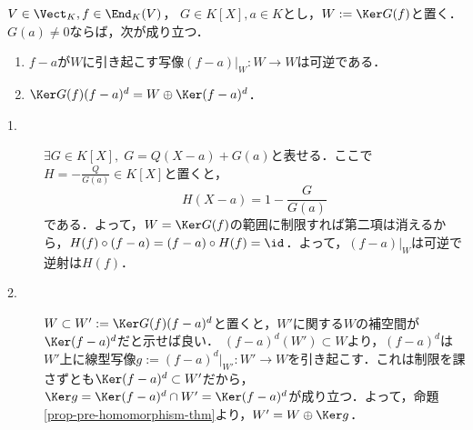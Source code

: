 \documentclass[uplatex, dvipdfmx]{jsreport}
\begin{document}
\begin{lemma}\label{lemma-for-triangulization}
    $V\in\Vect_K,f\in\End_K(V)$，
    $G\in K[X],a\in K$とし，$W:=\Ker G(f)$と置く．$G(a)\ne 0$ならば，次が成り立つ．
    \begin{enumerate}
        \item $f-a$が$W$に引き起こす写像$(f-a)|_W:W\to W$は可逆である．
        \item $\Ker G(f)(f-a)^d=W\oplus\Ker(f-a)^d$．
    \end{enumerate}
\end{lemma}
\begin{Proof}\mbox{}
    \begin{description}
        \item[1.] $\exists G\in K[X],\; G=Q(X-a)+G(a)$と表せる．ここで$H=-\frac{Q}{G(a)}\in K[X]$と置くと，
        \[H(X-a)=1-\frac{G}{G(a)}\]
        である．よって，$W=\Ker G(f)$の範囲に制限すれば第二項は消えるから，$H(f)\circ (f-a)=(f-a)\circ H(f)=\id$．よって，$(f-a)|_W$は可逆で逆射は$H(f)$．
        \item[2.] $W\subset W':=\Ker G(f)(f-a)^d$と置くと，$W'$に関する$W$の補空間が$\Ker(f-a)^d$だと示せば良い．
        $(f-a)^d(W')\subset W$より，$(f-a)^d$は$W'$上に線型写像$g:=(f-a)^d|_{W'}:W'\to W$を引き起こす．これは制限を課さずとも$\Ker(f-a)^d\subset W'$だから，$\Ker g=\Ker(f-a)^d\cap W'=\Ker (f-a)^d$が成り立つ．よって，命題\ref{prop-pre-homomorphism-thm}より，$W'=W\oplus\Ker g$．
    \end{description}
\end{Proof}
\end{document}
